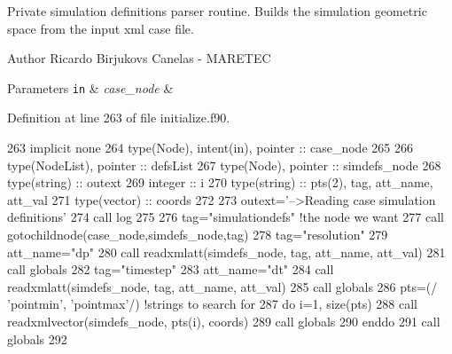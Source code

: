 Private simulation definitions parser routine. Builds the simulation geometric space from the input xml case file. 

\begin{DoxyAuthor}{Author}
Ricardo Birjukovs Canelas -\/ M\+A\+R\+E\+T\+EC
\end{DoxyAuthor}

\begin{DoxyParams}[1]{Parameters}
\mbox{\tt in}  & {\em case\+\_\+node} & \\
\hline
\end{DoxyParams}


Definition at line 263 of file initialize.\+f90.


\begin{DoxyCode}
263     \textcolor{keywordtype}{implicit none}
264     \textcolor{keywordtype}{type}(Node), \textcolor{keywordtype}{intent(in)}, \textcolor{keywordtype}{pointer} :: case\_node
265 
266     \textcolor{keywordtype}{type}(NodeList), \textcolor{keywordtype}{pointer} :: defsList
267     \textcolor{keywordtype}{type}(Node), \textcolor{keywordtype}{pointer} :: simdefs\_node
268     \textcolor{keywordtype}{type}(string) :: outext
269     \textcolor{keywordtype}{integer} :: i
270     \textcolor{keywordtype}{type}(string) :: pts(2), tag, att\_name, att\_val
271     \textcolor{keywordtype}{type}(vector) :: coords
272 
273     outext=\textcolor{stringliteral}{'-->Reading case simulation definitions'}
274     \textcolor{keyword}{call }log%
275 
276     tag=\textcolor{stringliteral}{"simulationdefs"}    \textcolor{comment}{!the node we want}
277     \textcolor{keyword}{call }gotochildnode(case\_node,simdefs\_node,tag)
278     tag=\textcolor{stringliteral}{"resolution"}
279     att\_name=\textcolor{stringliteral}{"dp"}
280     \textcolor{keyword}{call }readxmlatt(simdefs\_node, tag, att\_name, att\_val)
281     \textcolor{keyword}{call }globals%
282     tag=\textcolor{stringliteral}{"timestep"}
283     att\_name=\textcolor{stringliteral}{"dt"}
284     \textcolor{keyword}{call }readxmlatt(simdefs\_node, tag, att\_name, att\_val)
285     \textcolor{keyword}{call }globals%
286     pts=(/ \textcolor{stringliteral}{'pointmin'}, \textcolor{stringliteral}{'pointmax'}/) \textcolor{comment}{!strings to search for}
287     \textcolor{keywordflow}{do} i=1, \textcolor{keyword}{size}(pts)
288         \textcolor{keyword}{call }readxmlvector(simdefs\_node, pts(i), coords)
289         \textcolor{keyword}{call }globals%
290 \textcolor{keywordflow}{    enddo}
291     \textcolor{keyword}{call }globals%
292 
\end{DoxyCode}
